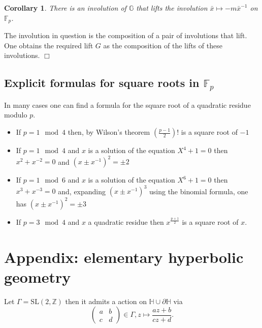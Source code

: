 \documentclass[12pt,a4paper]{amsart}
\newtheorem{coro}[thm]{Corollary}
\def\GG{\mathbb{G}}
\def\dHH{\partial \mathbb{H}}
\def\ZZ{\mathbb{Z}}
\def\fp{\mathbb{F}_p}
\def\sl2{\mathrm{SL}(2, \ZZ)}
\begin{document}
\begin{coro}
There is an involution of $\GG$ that lifts the involution 
$\bar{x} \mapsto -m\bar{x}^{-1}$ on $\fp$.
\end{coro}
\proof The involution in question is the composition of a pair of
involutions that lift. 
One obtains the required lift $G$ as the composition of the lifts of
these involutions. 
\hfill $\Box$

\subsection{Explicit formulas for square roots in $\fp$}

In many cases one can find a formula for the square root of a
quadratic residue modulo $p$.
\begin{itemize}
	\item If $p = 1 \mod 4$ then, by Wilson's theorem
		$\left(\frac{p-1}{2}\right)!$ is a square root of $-1$
	\item If $p = 1 \mod 4$ and $x$ is a solution of the
		equation
		$X^4+1 = 0$ then $x^2 + x^{-2}=0$
		and $(x\pm x^{-1})^2 = \pm 2$
	
	\item If $p = 1 \mod 6$ and $x$ is a solution of the
		equation
		$X^6+1 = 0$ then $x^3 + x^{-3}=0$
		and, expanding  $(x\pm x^{-1})^3$
		using the binomial formula, one has
		$(x\pm x^{-1})^2 = \pm 3$
	\item If $p = 3 \mod 4$ and $x$ a quadratic residue
		then $x^\frac{p+1}{2}$ is a square root of
		$x$.
		
\end{itemize}

\section{Appendix: elementary hyperbolic geometry}
\label{appendix}

Let $\Gamma = \sl2$ then it admits a action on $\mathbb{H}\cup \dHH$ via
$$
\begin{pmatrix} a&b\\c&d \end{pmatrix} \in \Gamma,
z \mapsto \frac{az + b}{cz + d}.
$$
\end{document}
